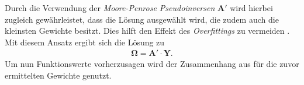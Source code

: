 Durch die Verwendung der \textit{Moore-Penrose Pseudoinversen} $\mathbf{A}'$ wird hierbei zugleich gewährleistet, dass die Lösung ausgewählt wird, die zudem auch die kleinsten Gewichte besitzt. Dies hilft den Effekt des \textit{Overfittings} zu vermeiden \cite{lowe2multi}. Mit diesem Ansatz ergibt sich die Lösung zu
\begin{align}
\mathbf{\Omega} = \mathbf{A}' \cdot \mathbf{Y}.
\end{align}
Um nun Funktionswerte vorherzusagen wird der Zusammenhang aus \label{eq:rbf_lincomb} für die zuvor ermittelten Gewichte genutzt.